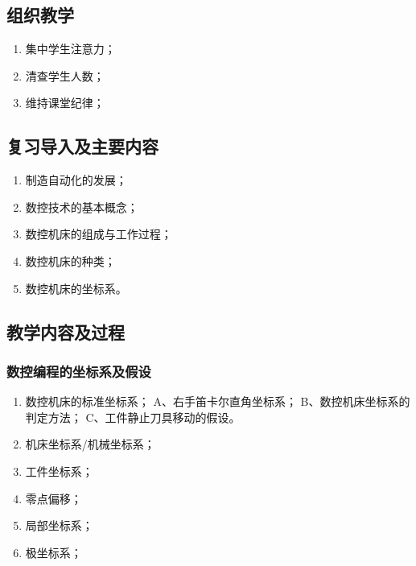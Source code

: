 \jxhj{%
	}

\makeshouye %

\subsection{组织教学}
\begin{enumerate}[1、]
	\item 集中学生注意力；
	\item 清查学生人数；
	\item 维持课堂纪律；
\end{enumerate}
\subsection{复习导入及主要内容}
\begin{enumerate}[1、]
	\item 制造自动化的发展；
	\item 数控技术的基本概念；
	\item 数控机床的组成与工作过程；
	\item 数控机床的种类；
	\item 数控机床的坐标系。
\end{enumerate}
\subsection{教学内容及过程}
\subsubsection{数控编程的坐标系及假设}
\begin{enumerate}[1、]
	\item 数控机床的标准坐标系；
	\subitem A、右手笛卡尔直角坐标系；
	\subitem B、数控机床坐标系的判定方法；
	\subitem C、工件静止刀具移动的假设。 
	\item 机床坐标系/机械坐标系；
	\item 工件坐标系；
	\item 零点偏移；
	\item 局部坐标系；
	\item 极坐标系；
\end{enumerate}
